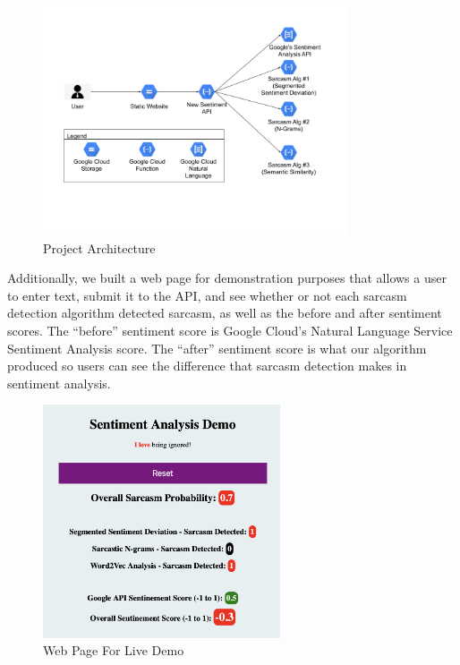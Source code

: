 \documentclass[conference]{IEEEtran}
\begin{document}
\begin{figure}[htbp]
\centerline{\includegraphics[width=9cm]{CS6221 Project Architecture Diagram-2.png}}
\caption{Project Architecture}
\label{fig6}
\end{figure}

Additionally, we built a web page for demonstration purposes that allows a user to enter text, submit it to the API, and see whether or not each sarcasm detection algorithm detected sarcasm, as well as the before and after sentiment scores. The “before” sentiment score is Google Cloud’s Natural Language Service Sentiment Analysis score. The “after” sentiment score is what our algorithm produced so users can see the difference that sarcasm detection makes in sentiment analysis.\\


\begin{figure}[htbp]
\centerline{\includegraphics[width=7cm]{Screen Shot 2020-11-30 at 5.04.44 PM.png}}
\caption{Web Page For Live Demo}
\label{fig7}
\end{figure}
\end{document}
